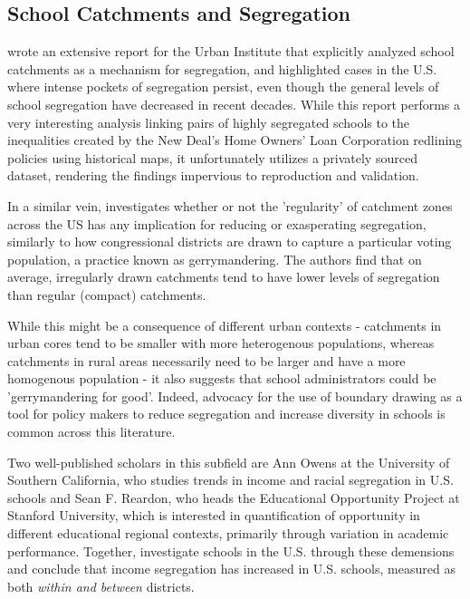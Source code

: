 \subsection{School Catchments and Segregation}

\cite{monarrez2021RaciallyUnequal} wrote an extensive report for the
Urban Institute that explicitly analyzed school catchments as a
mechanism for segregation, and highlighted cases in the U.S. where
intense pockets of segregation persist, even though the general levels
of school segregation have decreased in recent decades. While this
report performs a very interesting analysis linking pairs of highly
segregated schools to the inequalities created by the New Deal's Home
Owners' Loan Corporation redlining policies using historical maps, it
unfortunately utilizes a privately sourced dataset, rendering the
findings impervious to reproduction and validation.

In a similar vein,\cite{saporito2016IrregularlyShaped} investigates
whether or not the 'regularity' of catchment zones across the US has
any implication for reducing or exasperating segregation, similarly to
how congressional districts are drawn to capture a particular voting
population, a practice known as gerrymandering. The authors find that
on average, irregularly drawn catchments tend to have lower levels of
segregation than regular (compact) catchments.

While this might be a consequence of different urban contexts -
catchments in urban cores tend to be smaller with more heterogenous
populations, whereas catchments in rural areas necessarily need to be
larger and have a more homogenous population - it also suggests that
school administrators could be 'gerrymandering for good'. Indeed,
advocacy for the use of boundary drawing as a tool for policy makers
to reduce segregation and increase diversity in schools is common
across this literature.

Two well-published scholars in this subfield are Ann Owens at the
University of Southern California, who studies trends in income and
racial segregation in U.S. schools and Sean F. Reardon, who heads the
Educational Opportunity Project at Stanford University, which is
interested in quantification of opportunity in different educational
regional contexts, primarily through variation in academic
performance. Together, \cite{owens2016IncomeSegreation} investigate
schools in the U.S. through these demensions and conclude that income
segregation has increased in U.S. schools, measured as both
\emph{within and between} districts.


